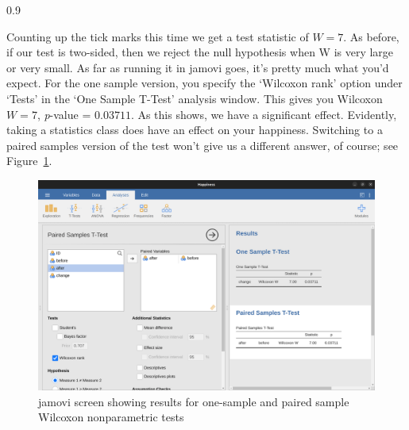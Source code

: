 \documentclass[
  a4paper,
]{book}
\begin{document}
\begin{table}[ht]
\begin{centerbox}
\begin{threeparttable}
\begin{tabularx}{0.9\textwidth}
\end{tabularx} 

\end{threeparttable}\par\end{centerbox}

\end{table}
 

Counting up the tick marks this time we get a test statistic of
\(W = 7\). As before, if our test is two-sided, then we reject the null
hypothesis when W is very large or very small. As far as running it in
jamovi goes, it's pretty much what you'd expect. For the one sample
version, you specify the `Wilcoxon rank' option under `Tests' in the
`One Sample T-Test' analysis window. This gives you Wilcoxon \(W = 7\),
\emph{p}-value = \(0.03711\). As this shows, we have a significant
effect. Evidently, taking a statistics class does have an effect on your
happiness. Switching to a paired samples version of the test won't give
us a different answer, of course; see Figure~\ref{fig-fig11-27}.

\begin{figure}

\includegraphics[width=1\textwidth,height=\textheight]{images/fig11-27.png} \hfill{}

\caption{\label{fig-fig11-27}jamovi screen showing results for
one-sample and paired sample Wilcoxon nonparametric tests}

\end{figure}
\end{document}
